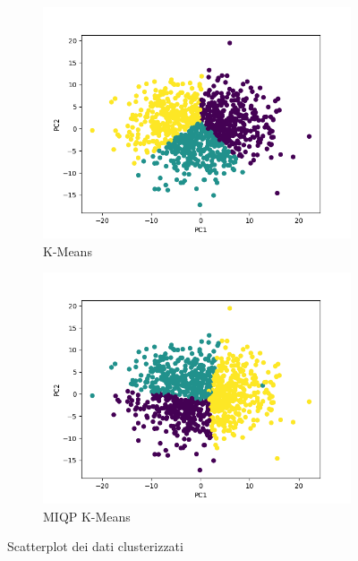 \documentclass{article}
\begin{document}
    \begin{figure}[h]
     \centering
     \begin{subfigure}[b]{0.49\linewidth}
         \centering
         \includegraphics[width=\linewidth]{../results/plots/scatter_carino_kmeans}
         \caption{K-Means}
     \end{subfigure}
     \begin{subfigure}[b]{0.49\linewidth}
         \centering
         \includegraphics[width=\linewidth]{../results/plots/scatter_carino}
         \caption{MIQP K-Means}
     \end{subfigure}
     \caption{Scatterplot dei dati clusterizzati}
     \label{fig:scatter_version}
    \end{figure}
\end{document}
